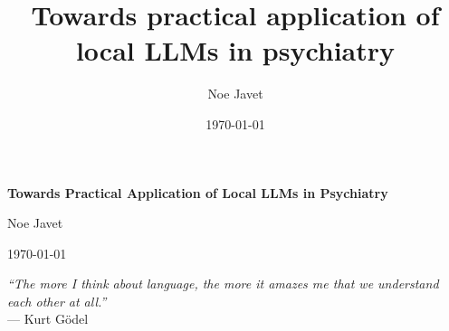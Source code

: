 \documentclass[12pt,a4paper]{article}
\title{Towards practical application of local LLMs in psychiatry}
\author{Noe Javet}
\date{\today}
\begin{document}
\begin{titlepage}
\centering

\vspace*{2cm}

{\Huge \bfseries Towards Practical Application of Local LLMs in Psychiatry\par}
\vspace{1cm}
{\Large Noe Javet\par}
\vspace{0.5cm}
{\large \today\par}

\vfill

\emph{“The more I think about language, the more it amazes me that we understand each other at all.”} \\
\vspace{0.5em}
— Kurt Gödel

\vspace*{2cm}

\end{titlepage}

\tableofcontents
\clearpage






\clearpage

\clearpage

\clearpage


\printbibliography

\cleardoublepage
\end{document}
